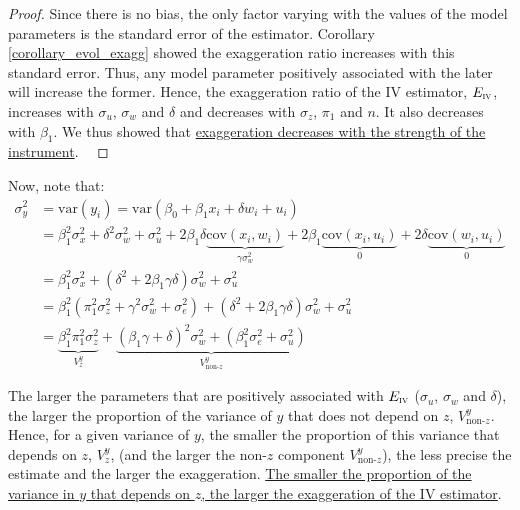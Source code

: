 \documentclass[a4paper, 11pt]{report}
\begin{document}
			\begin{proof}
				Since there is no bias, the only factor varying with the values of the model parameters is the standard error of the estimator. Corollary \ref{corollary_evol_exagg} showed the exaggeration ratio increases with this standard error. Thus, any model parameter positively associated with the later will increase the former. Hence, the exaggeration ratio of the IV estimator, $E_{\textsc{iv}}$, increases with $\sigma_{u}$, $\sigma_{w}$ and $\delta$ and decreases with $\sigma_{z}$, $\pi_{1}$ and $n$. It also decreases with $\beta_{1}$. We thus showed that \ul{exaggeration decreases with the strength of the instrument}. 
			~
			\end{proof}
				
				Now, note that:
				~
				\begin{align*}
					\sigma_{y}^{2} & =  \text{var}(y_{i}) = \text{var}(\beta_{0} + \beta_{1}x_{i} + \delta w_{i} + u_{i})\\
						& = \beta_{1}^{2}\sigma_{x}^{2} + \delta^{2}\sigma_{w}^{2} + \sigma_{u}^{2} + 2\beta_{1}\delta \underbrace{\text{cov}(x_{i}, w_{i})}_{\gamma \sigma_{w}^{2}} + 2 \beta_{1}  \underbrace{\text{cov}(x_{i}, u_{i})}_{0} + 2\delta \underbrace{\text{cov}(w_{i}, u_{i})}_{0} \\
						& = \beta_{1}^{2}\sigma_{x}^{2} + (\delta^{2} + 2\beta_{1}\gamma\delta)\sigma_{w}^{2} + \sigma_{u}^{2}\\
						& = \beta_{1}^{2}(\pi_{1}^{2}\sigma_{z}^{2} + \gamma^{2}\sigma_{w}^{2} + \sigma_{e}^{2}) + (\delta^{2} + 2\beta_{1}\gamma\delta)\sigma_{w}^{2} + \sigma_{u}^{2}\\
						& = \underbrace{\beta_{1}^{2}\pi_{1}^{2}\sigma_{z}^{2}}_{V_{z}^{y}} + \underbrace{(\beta_{1}\gamma + \delta)^{2}\sigma_{w}^{2} + (\beta_{1}^{2}\sigma_{e}^{2} + \sigma_{u}^{2})}_{V_{\text{non-}z}^{y}}
				\end{align*}
				
				The larger the parameters that are positively associated with $E_{\textsc{iv}}$ ($\sigma_{u}$, $\sigma_{w}$ and $\delta$), the larger the proportion of the variance of $y$ that does not depend on $z$, $V_{\text{non-}z}^{y}$. Hence, for a given variance of $y$, the smaller the proportion of  this variance that depends on $z$, $V_{z}^{y}$, (and the larger the non-$z$ component $V_{\text{non-}z}^{y}$), the less precise the estimate and the larger the exaggeration. \ul{The smaller the proportion of the variance in $y$ that depends on $z$, the larger the exaggeration of the IV estimator}.\\
				
\end{document}
